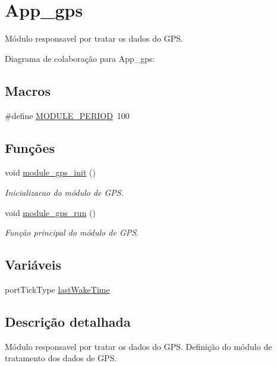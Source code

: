 \hypertarget{group__app__gps}{\section{App\-\_\-gps}
\label{group__app__gps}
}


Módulo responsavel por tratar os dados do G\-P\-S.  


Diagrama de colaboração para App\-\_\-gps\-:
\subsection*{Macros}
\begin{DoxyCompactItemize}
\item 
\#define \hyperlink{group__app__gps_ga0ac6c9f2991b096e49c354e5cce6fae0}{M\-O\-D\-U\-L\-E\-\_\-\-P\-E\-R\-I\-O\-D}~100
\end{DoxyCompactItemize}
\subsection*{Funções}
\begin{DoxyCompactItemize}
\item 
void \hyperlink{group__app__gps_ga9ee93102a0a5aec6877376bbcaf1dcb0}{module\-\_\-gps\-\_\-init} ()
\begin{DoxyCompactList}\small\item\em Inicializacao do módulo de G\-P\-S. \end{DoxyCompactList}\item 
void \hyperlink{group__app__gps_gace423457cfae0d22bd57db9e2fb4c033}{module\-\_\-gps\-\_\-run} ()
\begin{DoxyCompactList}\small\item\em Função principal do módulo de G\-P\-S. \end{DoxyCompactList}\end{DoxyCompactItemize}
\subsection*{Variáveis}
\begin{DoxyCompactItemize}
\item 
port\-Tick\-Type \hyperlink{group__app__gps_gaa8db3871cb5f64abbd94ddd5a1db73a6}{last\-Wake\-Time}
\end{DoxyCompactItemize}


\subsection{Descrição detalhada}
Módulo responsavel por tratar os dados do G\-P\-S. Definição do módulo de tratamento dos dados de G\-P\-S. 


